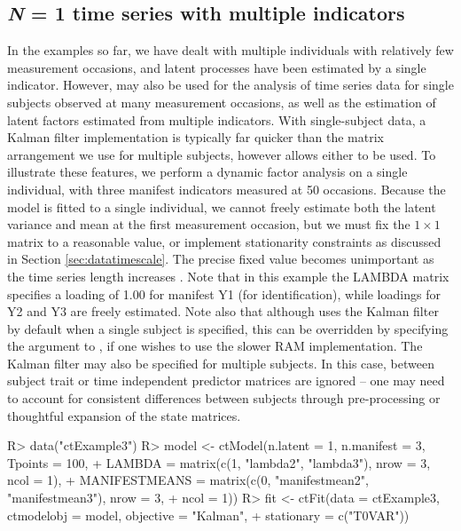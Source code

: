 \documentclass[nojss]{jss}\usepackage[]{graphicx}\usepackage[]{color}
\begin{document}
\subsection[N = 1 Time series with multiple indicators]{\textit{N} = 1 time series with multiple indicators} \label{sec:timeseries}
In the examples so far, we have dealt with multiple individuals with relatively few measurement occasions, and latent processes have been estimated by a single indicator. However,  may also be used for the analysis of time series data for single subjects observed at many measurement occasions, as well as the estimation of latent factors estimated from multiple indicators. With single-subject data, a Kalman filter implementation is typically far quicker than the matrix arrangement we use for multiple subjects, however  allows either to be used.  To illustrate these features, we perform a dynamic factor analysis on a single individual, with three manifest indicators measured at 50 occasions. Because the model is fitted to a single individual, we cannot freely estimate both the latent variance and mean at the first measurement occasion, but we must fix the $1 \times 1$  matrix to a reasonable value, or implement stationarity constraints as discussed in Section \ref{sec:datatimescale}. The precise fixed value becomes unimportant as the time series length increases \citep{durbin2012time}. Note that in this example the LAMBDA matrix specifies a loading of 1.00 for manifest Y1 (for identification), while loadings for Y2 and Y3 are freely estimated. Note also that although  uses the Kalman filter by default when a single subject is specified, this can be overridden by specifying the  argument to , if one wishes to use the slower RAM implementation. The Kalman filter may also be specified for multiple subjects. In this case, between subject trait or time independent predictor matrices are ignored -- one may need to account for consistent differences between subjects through pre-processing or thoughtful expansion of the state matrices.

\begin{Schunk}
\begin{Sinput}
R> data("ctExample3")
R> model <- ctModel(n.latent = 1, n.manifest = 3, Tpoints = 100, 
+   LAMBDA = matrix(c(1, "lambda2", "lambda3"), nrow = 3, ncol = 1), 
+   MANIFESTMEANS = matrix(c(0, "manifestmean2", "manifestmean3"), nrow = 3, 
+     ncol = 1))
R> fit <- ctFit(data = ctExample3, ctmodelobj = model, objective = "Kalman",
+   stationary = c("T0VAR"))
\end{Sinput}
\end{Schunk}
\end{document}
